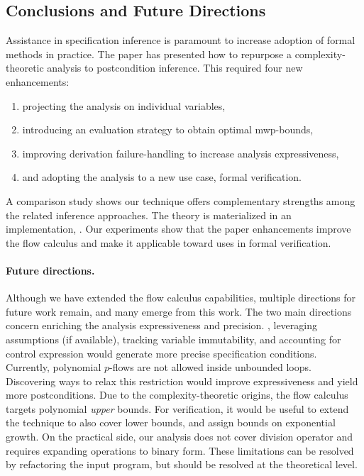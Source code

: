 \subsection{Conclusions and Future Directions}
\label{sec:pc-conclusion}

Assistance in specification inference is paramount to increase adoption of formal methods in practice.
The paper has presented how to repurpose a complexity-theoretic analysis to postcondition inference.
This required four new enhancements:

\begin{enumerate}[label=(\roman*)]
\item projecting the analysis on individual variables,
\item introducing an evaluation strategy to obtain optimal mwp-bounds,
\item improving derivation failure-handling to increase analysis expressiveness,
\item and adopting the analysis to a new use case, \ie formal verification.
\end{enumerate}

A comparison study shows our technique offers complementary strengths among the related inference approaches.
The theory is materialized in an implementation, \ndx{\impl}.
Our experiments show that the paper enhancements improve the flow calculus and make it applicable toward uses in formal verification.

\paragraph*{Future directions.}
Although we have extended the flow calculus capabilities, multiple directions for future work remain, and many emerge from this work.
The two main directions concern enriching the analysis expressiveness and precision.
\Eg, leveraging assumptions (if available), tracking variable immutability, and accounting for control expression would generate more precise specification conditions.
Currently, polynomial \(p\)-flows are not allowed inside unbounded loops.
Discovering ways to relax this restriction would improve expressiveness and yield more postconditions.
Due to the complexity-theoretic origins, the flow calculus targets polynomial \emph{upper} bounds.
For verification, it would be useful to extend the technique to also cover lower bounds, and assign bounds on exponential growth.
On the practical side, our analysis does not cover division operator and requires expanding operations to binary form.
These limitations can be resolved by refactoring the input program, but should be resolved at the theoretical level.

